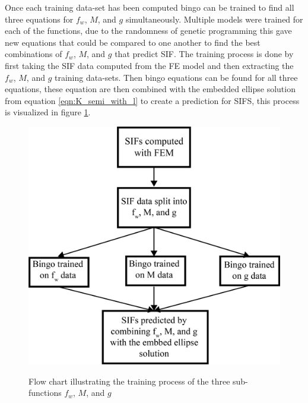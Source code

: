 Once each training data-set has been computed bingo can be trained to find all three equations for $f_w$, $M$, and $g$ simultaneously. Multiple models were trained for each of the functions, due to the randomness of genetic programming this gave new equations that could be compared to one another to find the best combinations of $f_w$, $M$, and $g$ that predict SIF. The training process is done by first taking the SIF data computed from the FE model and then extracting the $f_w$, $M$, and $g$ training data-sets. Then bingo equations can be found for all three equations, these equation are then combined with the embedded ellipse solution from equation \ref{eqn:K_semi_with_l} to create a prediction for SIFS, this process is visualized in figure \ref{fig:training_flow}.

\begin{figure}
    \centering
    \includegraphics[width=\textwidth]{geometry_figures/training_flow.png}
    \label{fig:training_flow}
    \caption{Flow chart illustrating the training process of the three sub-functions $f_w$, $M$, and $g$}
\end{figure}




